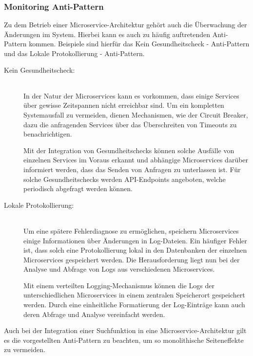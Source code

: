 \subsubsection*{Monitoring Anti-Pattern}

Zu dem Betrieb einer Microservice-Architektur gehört auch die Überwachung der Änderungen im System. Hierbei kann es auch zu häufig auftretenden Anti-Pattern kommen. Beispiele sind hierfür das \glqq Kein Gesundheitscheck\grqq{} - Anti-Pattern und das \glqq Lokale Protokollierung\grqq{} - Anti-Pattern.

\begin{description}
    \item[Kein Gesundheitscheck:]\hfill \\
    In der Natur der Microservices kann es vorkommen, dass einige Services über gewisse Zeitspannen nicht erreichbar sind. Um ein kompletten Systemausfall zu vermeiden, dienen Mechanismen, wie der Circuit Breaker, dazu die anfragenden Services über das Überschreiten von Timeouts zu benachrichtigen.

    Mit der Integration von Gesundheitschecks können solche Ausfälle von einzelnen Services im Voraus erkannt und abhängige Microservices darüber informiert werden, dass das Senden von Anfragen zu unterlassen ist. Für solche Gesundheitschecks werden API-Endpoints angeboten, welche periodisch abgefragt werden können.
    
    \item[Lokale Protokollierung:]\hfill \\
    Um eine spätere Fehlerdiagnose zu ermöglichen, speichern Microservices einige Informationen über Änderungen in Log-Dateien. Ein häufiger Fehler ist, dass solch eine Protokollierung lokal in den Datenbanken der einzelnen Microservices gespeichert werden. Die Herausforderung liegt nun bei der Analyse und Abfrage von Logs aus verschiedenen Microservices.

    Mit einem verteilten Logging-Mechanismus können die Logs der unterschiedlichen Microservices in einem zentralen Speicherort gespeichert werden. Durch eine einheitliche Formatierung der Log-Einträge kann auch deren Abfrage und Analyse vereinfacht werden.

\end{description}

Auch bei der Integration einer Suchfunktion in eine Microservice-Architektur gilt es die vorgestellten Anti-Pattern zu beachten, um so monolithische Seiteneffekte zu vermeiden.
